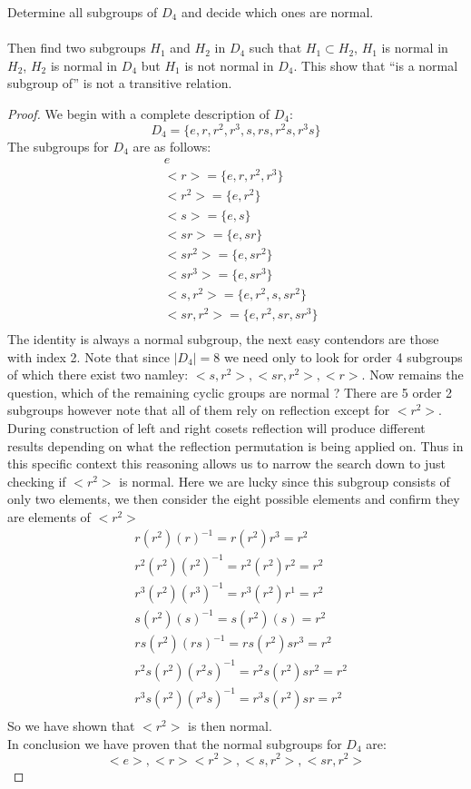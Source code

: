 \documentclass[11pt]{article}
\theoremstyle{definition}  %
\newcommand{\block}[2]{\begin{tcolorbox}[title={#1}]{#2}\end{tcolorbox}}
\begin{document}
\block{Question #3}{
 Determine all subgroups of $D_4$ and decide which ones are normal.\\\\ Then find two subgroups $H_1$ and $H_2$ in $D_4$ such that $H_1 \subset H_2$,
  $H_1$ is normal in $H_2$, $H_2$ is normal in $D_4$ but $H_1$ is not normal in $D_4$. This show that ``is a normal subgroup of'' is not a transitive relation.
  }
  \begin{proof}
    We begin with a complete description of $D_4$:
    \[
      D_4=\{e,r,r^2,r^3,s,rs,r^2s,r^3s\}
    \]
    The subgroups for $D_4$ are as follows:
    \begin{align*}
      &{e}\\
      &<r>=\{e,r,r^2,r^3\}\\
      &<r^2>=\{e,r^2\}\\
      &<s>=\{e,s\}\\
      &<sr>=\{e,sr\}\\
      &<sr^2>=\{e,sr^2\}\\
      &<sr^3>=\{e,sr^3\}\\
      &<s,r^2>=\{e,r^2,s,sr^2\}\\
      &<sr,r^2>=\{e,r^2,sr,sr^3\}\\
    \end{align*}
    The identity is always a normal subgroup, the next easy contendors are those with index 2. Note that since $|D_4|=8$ we need only to look for order 4 subgroups of which there exist two namley: $<s,r^2>,<sr,r^2>,<r>$. Now remains the question, which of the remaining cyclic groups are normal ? There are 5 order 2 subgroups however note that all of them rely on reflection except for $<r^2>$. During construction of left and right cosets reflection will produce different results depending on what the reflection permutation is being applied on. Thus in this specific context this reasoning allows us to narrow the search down to just checking if $<r^2>$ is normal. Here we are lucky since this subgroup consists of only two elements, we then consider the eight possible elements and confirm they are elements of $<r^2>$ \\
    \begin{align*}
      &r(r^2)(r)^{-1}=r(r^2)r^3=r^2\\
      &r^2(r^2)(r^2)^{-1}=r^2(r^2)r^2=r^2\\
      &r^3(r^2)(r^3)^{-1}=r^3(r^2)r^1=r^2\\
      &s(r^2)(s)^{-1}=s(r^2)(s)=r^2\\
      &rs(r^2)(rs)^{-1}=rs(r^2)sr^3=r^2\\
      &r^2s(r^2)(r^2s)^{-1}=r^2s(r^2)sr^2=r^2\\
      &r^3s(r^2)(r^3s)^{-1}=r^3s(r^2)sr=r^2\\
    \end{align*}
    So we have shown that $<r^2>$ is then normal. \\
    In conclusion we have proven that the normal subgroups for $D_4$ are:
    \[
      <e>,<r><r^2>,<s,r^2>,<sr,r^2>
    \]
  \end{proof}
\end{document}
